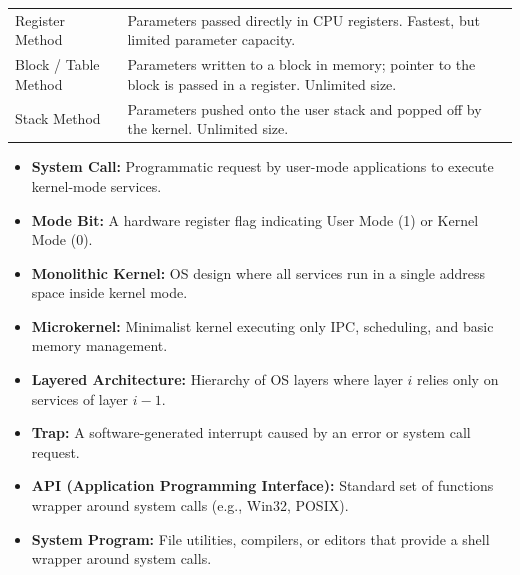\documentclass[12pt,a4paper]{article}
\renewcommand{\arraystretch}{1.45}
\begin{document}
\begin{tcolorbox}[formulabox, title={\textbf{System Call Parameter Passing Methods}}]
\renewcommand{\arraystretch}{1.3}
\begin{tabularx}{\linewidth}{B{3.5cm} X}
Register Method & Parameters passed directly in CPU registers. Fastest, but limited parameter capacity. \\[4pt]
Block / Table Method & Parameters written to a block in memory; pointer to the block is passed in a register. Unlimited size. \\[4pt]
Stack Method & Parameters pushed onto the user stack and popped off by the kernel. Unlimited size.
\end{tabularx}
\end{tcolorbox}

\begin{tcolorbox}[defbox, title={\textbf{One-Line Definitions}}]
\begin{itemize}[leftmargin=*, itemsep=2.5pt, topsep=0pt]
  \item \textbf{System Call:} Programmatic request by user-mode applications to execute kernel-mode services.
  \item \textbf{Mode Bit:} A hardware register flag indicating User Mode (1) or Kernel Mode (0).
  \item \textbf{Monolithic Kernel:} OS design where all services run in a single address space inside kernel mode.
  \item \textbf{Microkernel:} Minimalist kernel executing only IPC, scheduling, and basic memory management.
  \item \textbf{Layered Architecture:} Hierarchy of OS layers where layer $i$ relies only on services of layer $i-1$.
  \item \textbf{Trap:} A software-generated interrupt caused by an error or system call request.
  \item \textbf{API (Application Programming Interface):} Standard set of functions wrapper around system calls (e.g., Win32, POSIX).
  \item \textbf{System Program:} File utilities, compilers, or editors that provide a shell wrapper around system calls.
\end{itemize}
\end{tcolorbox}
\end{document}
